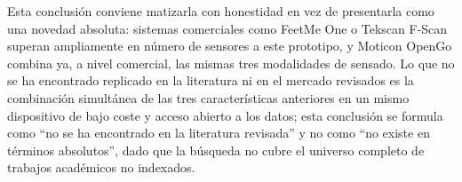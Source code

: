 \begin{IAtext}
Esta conclusión conviene matizarla con honestidad en vez de presentarla como una novedad absoluta: sistemas comerciales como FeetMe One o Tekscan F-Scan superan ampliamente en número de sensores a este prototipo, y Moticon OpenGo combina ya, a nivel comercial, las mismas tres modalidades de sensado. Lo que no se ha encontrado replicado en la literatura ni en el mercado revisados es la combinación simultánea de las tres características anteriores en un mismo dispositivo de bajo coste y acceso abierto a los datos; esta conclusión se formula como ``no se ha encontrado en la literatura revisada'' y no como ``no existe en términos absolutos'', dado que la búsqueda no cubre el universo completo de trabajos académicos no indexados.

\end{IAtext}
